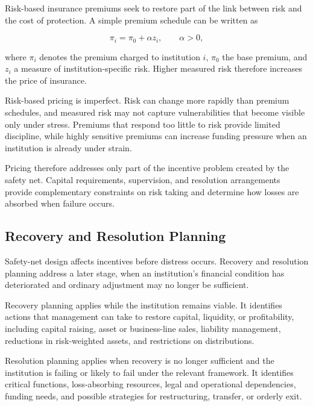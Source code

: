 Risk-based insurance premiums seek to restore part of the link between risk and the cost of protection. A simple premium schedule can be written as

\begin{equation}
\pi_i
=
\pi_0+\alpha z_i,
\qquad
\alpha>0,
\label{eq:ch23-risk-based-premium}
\end{equation}

where \(\pi_i\) denotes the premium charged to institution \(i\), \(\pi_0\) the base premium, and \(z_i\) a measure of institution-specific risk. Higher measured risk therefore increases the price of insurance.

Risk-based pricing is imperfect. Risk can change more rapidly than premium schedules, and measured risk may not capture vulnerabilities that become visible only under stress. Premiums that respond too little to risk provide limited discipline, while highly sensitive premiums can increase funding pressure when an institution is already under strain.

Pricing therefore addresses only part of the incentive problem created by the safety net. Capital requirements, supervision, and resolution arrangements provide complementary constraints on risk taking and determine how losses are absorbed when failure occurs.

\subsection{Recovery and Resolution Planning}

Safety-net design affects incentives before distress occurs. Recovery and resolution planning address a later stage, when an institution's financial condition has deteriorated and ordinary adjustment may no longer be sufficient.

Recovery planning applies while the institution remains viable. It identifies actions that management can take to restore capital, liquidity, or profitability, including capital raising, asset or business-line sales, liability management, reductions in risk-weighted assets, and restrictions on distributions.

Resolution planning applies when recovery is no longer sufficient and the institution is failing or likely to fail under the relevant framework. It identifies critical functions, loss-absorbing resources, legal and operational dependencies, funding needs, and possible strategies for restructuring, transfer, or orderly exit.

